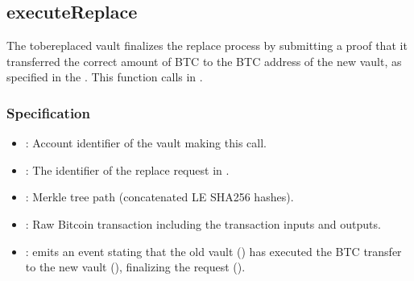 \documentclass[a4paper,10pt,english]{sphinxmanual}
\begin{document}
\subsection{executeReplace}
\label{\detokenize{spec/replace:executereplace}}\label{\detokenize{spec/replace:id9}}
The to\sphinxhyphen{}be\sphinxhyphen{}replaced vault finalizes the replace process by submitting a proof that it transferred the correct amount of BTC to the BTC address of the new vault, as specified in the . This function calls  in {\hyperref[\detokenize{spec/btc-relay:btc-relay}]{}}.


\subsubsection{Specification}
\label{\detokenize{spec/replace:id10}}


\begin{itemize}
\item {} 
: Account identifier of the vault making this call.

\item {} 
: The identifier of the replace request in .

\item {} 
: Merkle tree path (concatenated LE SHA256 hashes).

\item {} 
: Raw Bitcoin transaction including the transaction inputs and outputs.

\end{itemize}

\begin{itemize}
\item {} 
: emits an event stating that the old vault () has executed the BTC transfer to the new vault (), finalizing the  request ().

\end{itemize}
\end{document}
